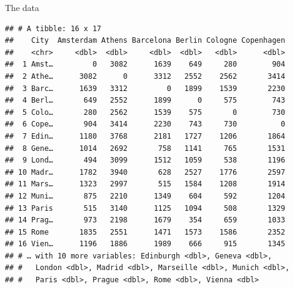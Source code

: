 \documentclass[ignorenonframetext,]{beamer}
\begin{document}
\begin{frame}[fragile]{The data}
\protect\hypertarget{the-data-13}{}

\scriptsize

\begin{verbatim}
## # A tibble: 16 x 17
##    City  Amsterdam Athens Barcelona Berlin Cologne Copenhagen
##    <chr>     <dbl>  <dbl>     <dbl>  <dbl>   <dbl>      <dbl>
##  1 Amst…         0   3082      1639    649     280        904
##  2 Athe…      3082      0      3312   2552    2562       3414
##  3 Barc…      1639   3312         0   1899    1539       2230
##  4 Berl…       649   2552      1899      0     575        743
##  5 Colo…       280   2562      1539    575       0        730
##  6 Cope…       904   3414      2230    743     730          0
##  7 Edin…      1180   3768      2181   1727    1206       1864
##  8 Gene…      1014   2692       758   1141     765       1531
##  9 Lond…       494   3099      1512   1059     538       1196
## 10 Madr…      1782   3940       628   2527    1776       2597
## 11 Mars…      1323   2997       515   1584    1208       1914
## 12 Muni…       875   2210      1349    604     592       1204
## 13 Paris       515   3140      1125   1094     508       1329
## 14 Prag…       973   2198      1679    354     659       1033
## 15 Rome       1835   2551      1471   1573    1586       2352
## 16 Vien…      1196   1886      1989    666     915       1345
## # … with 10 more variables: Edinburgh <dbl>, Geneva <dbl>,
## #   London <dbl>, Madrid <dbl>, Marseille <dbl>, Munich <dbl>,
## #   Paris <dbl>, Prague <dbl>, Rome <dbl>, Vienna <dbl>
\end{verbatim}

\normalsize

\end{frame}
\end{document}
